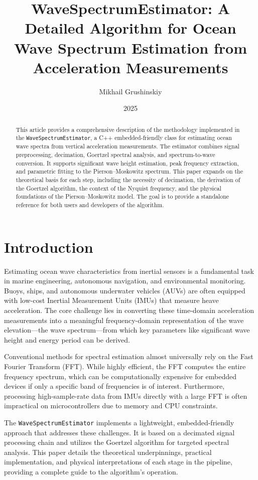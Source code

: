 \documentclass[11pt]{article}
\title{WaveSpectrumEstimator: A Detailed Algorithm for Ocean Wave Spectrum Estimation from Acceleration Measurements}
\author{Mikhail Grushinskiy}
\date{2025}
\begin{document}
\maketitle

\begin{abstract}
This article provides a comprehensive description of the methodology implemented in the \texttt{WaveSpectrumEstimator}, a C++ embedded-friendly class for estimating ocean wave spectra from vertical acceleration measurements. The estimator combines signal preprocessing, decimation, Goertzel spectral analysis, and spectrum-to-wave conversion. It supports significant wave height estimation, peak frequency extraction, and parametric fitting to the Pierson--Moskowitz spectrum. This paper expands on the theoretical basis for each step, including the necessity of decimation, the derivation of the Goertzel algorithm, the context of the Nyquist frequency, and the physical foundations of the Pierson--Moskowitz model. The goal is to provide a standalone reference for both users and developers of the algorithm.
\end{abstract}

\tableofcontents

\section{Introduction}
\label{sec:intro}
Estimating ocean wave characteristics from inertial sensors is a fundamental task in marine engineering, autonomous navigation, and environmental monitoring. Buoys, ships, and autonomous underwater vehicles (AUVs) are often equipped with low-cost Inertial Measurement Units (IMUs) that measure heave acceleration. The core challenge lies in converting these time-domain acceleration measurements into a meaningful frequency-domain representation of the wave elevation—the wave spectrum—from which key parameters like significant wave height and energy period can be derived.

Conventional methods for spectral estimation almost universally rely on the Fast Fourier Transform (FFT). While highly efficient, the FFT computes the entire frequency spectrum, which can be computationally expensive for embedded devices if only a specific band of frequencies is of interest. Furthermore, processing high-sample-rate data from IMUs directly with a large FFT is often impractical on microcontrollers due to memory and CPU constraints.

The \texttt{WaveSpectrumEstimator} implements a lightweight, embedded-friendly approach that addresses these challenges. It is based on a decimated signal processing chain and utilizes the Goertzel algorithm for targeted spectral analysis. This paper details the theoretical underpinnings, practical implementation, and physical interpretations of each stage in the pipeline, providing a complete guide to the algorithm's operation.
\end{document}
